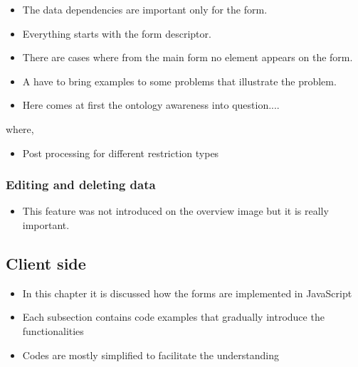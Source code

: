 \begin{itemize}
	\item The data dependencies are important only for the form. 
	\item Everything starts with the form descriptor.
	\item There are cases where from the main form no element appears on the form.
	\item A have to bring examples to some problems that illustrate the problem.
	\item Here comes at first the ontology awareness into question....
\end{itemize}



where,



\begin{itemize}
	\item Post processing for different restriction types
\end{itemize}



\subsubsection{Editing and deleting data}

\begin{itemize}
	\item This feature was not introduced on the overview image but it is really important.
\end{itemize}




\subsection{Client side} \label{511}

\begin{itemize}
	\item In this chapter it is discussed how the forms are implemented in JavaScript
	\item Each subsection contains code examples that gradually introduce the functionalities
	\item Codes are mostly simplified to facilitate the understanding		
\end{itemize}


